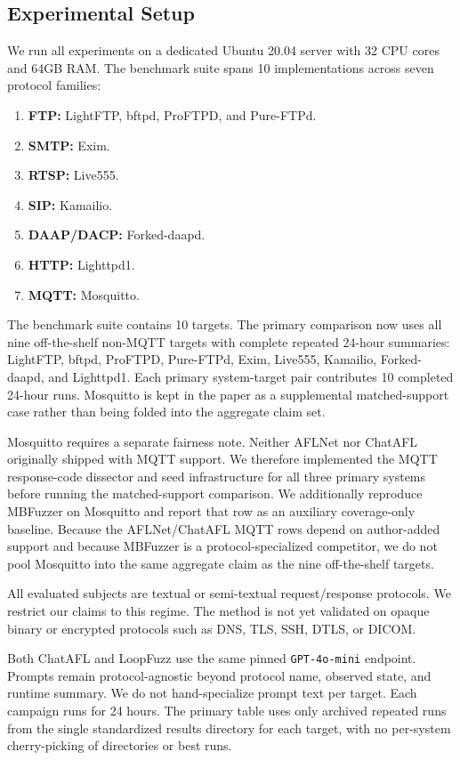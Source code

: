 \documentclass[conference]{IEEEtran}
\begin{document}
\subsection{Experimental Setup}
We run all experiments on a dedicated Ubuntu 20.04 server with 32 CPU cores and 64GB RAM. The benchmark suite spans 10 implementations across seven protocol families:
\begin{enumerate}
    \item \textbf{FTP:} LightFTP, bftpd, ProFTPD, and Pure-FTPd.
    \item \textbf{SMTP:} Exim.
    \item \textbf{RTSP:} Live555.
    \item \textbf{SIP:} Kamailio.
    \item \textbf{DAAP/DACP:} Forked-daapd.
    \item \textbf{HTTP:} Lighttpd1.
    \item \textbf{MQTT:} Mosquitto.
\end{enumerate}

The benchmark suite contains 10 targets. The primary comparison now uses all nine off-the-shelf non-MQTT targets with complete repeated 24-hour summaries: LightFTP, bftpd, ProFTPD, Pure-FTPd, Exim, Live555, Kamailio, Forked-daapd, and Lighttpd1. Each primary system-target pair contributes 10 completed 24-hour runs. Mosquitto is kept in the paper as a supplemental matched-support case rather than being folded into the aggregate claim set.

Mosquitto requires a separate fairness note. Neither AFLNet nor ChatAFL originally shipped with MQTT support. We therefore implemented the MQTT response-code dissector and seed infrastructure for all three primary systems before running the matched-support comparison. We additionally reproduce MBFuzzer on Mosquitto and report that row as an auxiliary coverage-only baseline. Because the AFLNet/ChatAFL MQTT rows depend on author-added support and because MBFuzzer is a protocol-specialized competitor, we do not pool Mosquitto into the same aggregate claim as the nine off-the-shelf targets.

All evaluated subjects are textual or semi-textual request/response protocols. We restrict our claims to this regime. The method is not yet validated on opaque binary or encrypted protocols such as DNS, TLS, SSH, DTLS, or DICOM.

Both ChatAFL and LoopFuzz use the same pinned \texttt{GPT-4o-mini} endpoint. Prompts remain protocol-agnostic beyond protocol name, observed state, and runtime summary. We do not hand-specialize prompt text per target. Each campaign runs for 24 hours. The primary table uses only archived repeated runs from the single standardized results directory for each target, with no per-system cherry-picking of directories or best runs.
\end{document}
